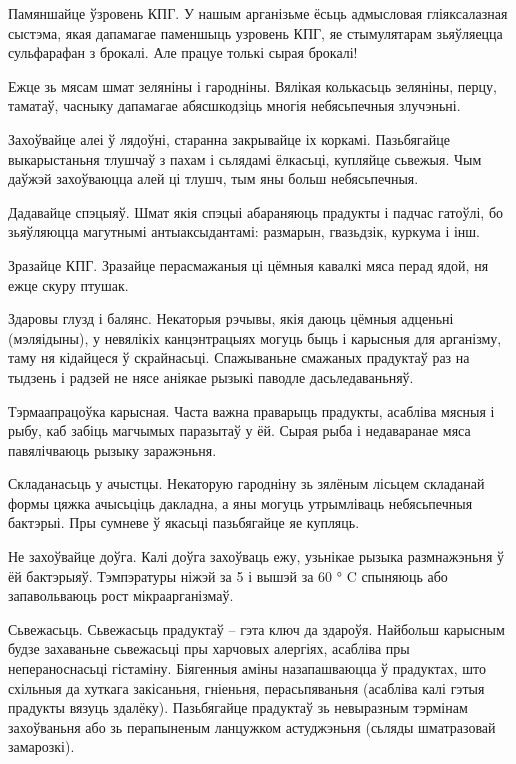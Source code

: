 Памяншайце ўзровень КПГ.
У нашым арганізьме ёсьць адмысловая гліяксалазная сыстэма, якая дапамагае паменшыць узровень КПГ, яе стымулятарам зьяўляецца сульфарафан з брокалі. Але працуе толькі сырая брокалі!

Ежце зь мясам шмат зеляніны і гародніны.
Вялікая колькасьць зеляніны, перцу, таматаў, часныку дапамагае абясшкодзіць многія небясьпечныя злучэньні.

Захоўвайце алеі ў лядоўні, старанна закрывайце іх коркамі. Пазьбягайце выкарыстаньня тлушчаў з пахам і сьлядамі ёлкасьці, купляйце сьвежыя. Чым даўжэй захоўваюцца алей ці тлушч, тым яны больш небясьпечныя.

Дадавайце спэцыяў.
Шмат якія спэцыі абараняюць прадукты і падчас гатоўлі, бо зьяўляюцца магутнымі антыаксыдантамі: размарын, гвазьдзік, куркума і інш.

Зразайце КПГ.
Зразайце перасмажаныя ці цёмныя кавалкі мяса перад ядой, ня ежце скуру птушак.

Здаровы глузд і балянс.
Некаторыя рэчывы, якія даюць цёмныя адценьні (мэляідыны), у невялікіх канцэнтрацыях могуць быць і карысныя для арганізму, таму ня кідайцеся ў скрайнасьці. Спажываньне смажаных прадуктаў раз на тыдзень і радзей не нясе аніякае рызыкі паводле дасьледаваньняў.

Тэрмаапрацоўка карысная.
Часта важна праварыць прадукты, асабліва мясныя і рыбу, каб забіць магчымых паразытаў у ёй. Сырая рыба і недаваранае мяса павялічваюць рызыку заражэньня.

Складанасьць у ачыстцы.
Некаторую гародніну зь зялёным лісьцем складанай формы цяжка ачысьціць дакладна, а яны могуць утрымліваць небясьпечныя бактэрыі. Пры сумневе ў якасьці пазьбягайце яе купляць.

Не захоўвайце доўга.
Калі доўга захоўваць ежу, узьнікае рызыка размнажэньня ў ёй бактэрыяў. Тэмпэратуры ніжэй за 5 і вышэй за 60 ° C спыняюць або запавольваюць рост мікраарганізмаў.

Сьвежасьць.
Сьвежасьць прадуктаў – гэта ключ да здароўя. Найбольш карысным будзе захаваньне сьвежасьці пры харчовых алергіях, асабліва пры непераноснасьці гістаміну. Біягенныя аміны назапашваюцца ў прадуктах, што схільныя да хуткага закісаньня, гніеньня, перасьпяваньня (асабліва калі гэтыя прадукты вязуць здалёку). Пазьбягайце прадуктаў зь невыразным тэрмінам захоўваньня або зь перапыненым ланцужком астуджэньня (сьляды шматразовай замарозкі).
